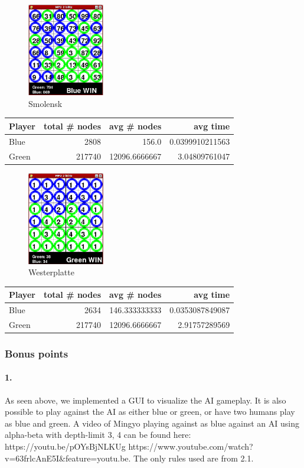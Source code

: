 \begin{multicols*}{2}
\begin{figure}[H]
\centering
\includegraphics[width=0.3\textwidth]{graphics/am_smolensk.png}
\caption{Smolensk}
\end{figure}
\begin{tabular}{l|r|r|r}
  Player & total \# nodes & avg \# nodes & avg time \\
  \hline
  Blue & 2808 & 156.0 & 0.0399910211563 \\
  Green & 217740 & 12096.6666667 & 3.04809761047 \\
\end{tabular}

\begin{figure}[H]
\centering
\includegraphics[width=0.3\textwidth]{graphics/am_westerplatte.png}
\caption{Westerplatte}
\end{figure}
\begin{tabular}{l|r|r|r}
  Player & total \# nodes & avg \# nodes & avg time \\
  \hline
  Blue & 2634 & 146.333333333 & 0.0353087849087 \\
  Green & 217740 & 12096.6666667 & 2.91757289569 \\
\end{tabular}

\end{multicols*}


\subsubsection*{Bonus points}
\paragraph{1.}
As seen above, we implemented a GUI to visualize the AI gameplay. It is also possible to play against the AI as either blue or green, or have two humans play as blue and green. A video of Mingyo playing against as blue against an AI using alpha-beta with depth-limit 3, 4 can be found here: https://youtu.be/pOYsBjNLKUg https://www.youtube.com/watch?v=63frlcAnE5I\&feature=youtu.be. The only rules used are from 2.1.
